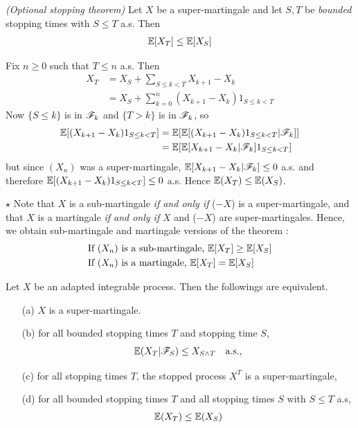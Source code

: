 \documentclass[12pt,a4paper]{report}
\newenvironment{proof}
{\begin{changemargin}{1cm}{0.5cm} 
	}%
	{\end{changemargin}
}
\begin{document}
 \emph{(Optional stopping theorem)} Let $X$ be a super-martingale and let $S,T$ be \emph{bounded} stopping times with $S \leq T$ a.s. Then
\begin{align*}
\mathbb{E}[X_T] \leq \mathbb{E}[X_S]
\end{align*}
\begin{proof}
\pf Fix $n\geq 0$ such that $T\leq n$ a.s. Then
\begin{align*}
X_T &= X_S + \sum_{S\leq k <T} X_{k+1} - X_k  \\
&= X_S + \sum_{k=0}^n (X_{k+1} - X_k) 1_{S\leq k <T}
\end{align*}
Now $\{S\leq k\}$ is in $\mathscr{F}_k$ and $\{T>k\}$ is in $\mathscr{F}_k$, so
\begin{align*}
\mathbb{E}[(X_{k+1} - X_k)1_{S\leq k <T}  ] &= \mathbb{E} [\mathbb{E}[ (X_{k+1} - X_k) 1_{S\leq k<T} |\mathscr{F}_k ]] \\
& = \mathbb{E}[ \mathbb{E} [  X_{k+1} -X_k | \mathscr{F}_k ] 1_{S\leq k < T} ]
\end{align*}
but since $(X_n)$ was a super-martingale,  $\mathbb{E} [  X_{k+1} -X_k | \mathscr{F}_k ] \leq 0$ a.s. and therefore $\mathbb{E}[(X_{k+1} - X_k)1_{S\leq k <T}  ] \leq 0$ a.s. Hence $\mathbb{E}(X_T) \leq \mathbb{E}(X_S)$.

\eop
\end{proof}
\s

$\star$ Note that $X$ is a sub-martingale \emph{if and only if} ($-X$) is a super-martingale, and that $X$ is a martingale \emph{if and only if} $X$ and ($-X$) are super-martingales. Hence, we obtain sub-martingale and martingale versions of the theorem :
\begin{align*}
&\text{If } (X_n) \text{ is a sub-martingale, } \mathbb{E}[X_T] \geq \mathbb{E}[X_S] \\
&\text{If } (X_n) \text{ is a martingale, } \mathbb{E}[X_T] = \mathbb{E}[X_S]
\end{align*}
\s

 Let $X$ be an adapted integrable process. Then the followings are equivalent.
\begin{itemize}
\item[(a)] $X$ is a super-martingale. 
\item[(b)] for all bounded stopping times $T$ and stopping time $S$,
\begin{align*}
\mathbb{E}(X_T |\mathscr{F}_S) \leq X_{S\wedge T} \quad \text{a.s.},
\end{align*}
\item[(c)] for all stopping times $T$, the stopped process $X^T$ is a super-martingale,
\item[(d)] for all bounded stopping times $T$ and all stopping times $S$ with $S\leq T$ a.s,
\begin{align*}
\mathbb{E}(X_T) \leq \mathbb{E}(X_S)
\end{align*}
\end{itemize}
\end{document}
